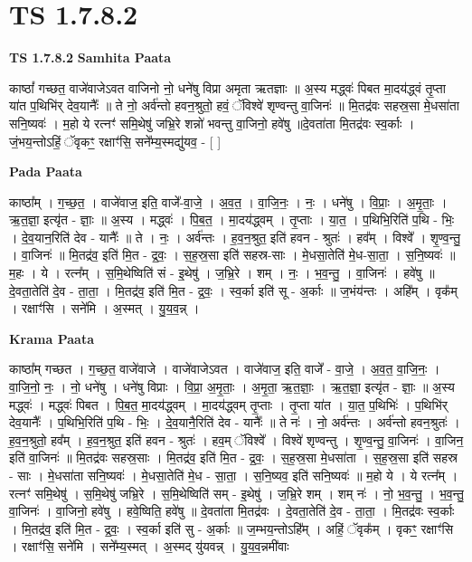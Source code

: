 \documentclass[17pt]{extarticle}
\begin{document}
\section{ TS 1.7.8.2 }

\textbf{TS 1.7.8.2 } \newline
\textbf{Samhita Paata} \newline

काष्ठां᳚ गच्छत॒ वाजे॑वाजेऽवत वाजिनो नो॒ धने॑षु विप्रा अमृता ऋतज्ञाः ॥ अ॒स्य मद्ध्वः॑ पिबत मा॒दय॑द्ध्वं तृ॒प्ता या॑त प॒थिभि॑र् देव॒यानैः᳚ ॥ ते नो॒ अर्व॑न्तो हवन॒श्रुतो॒ हवं॒ ॅविश्वे॑ शृण्वन्तु वा॒जिनः॑ ॥ मि॒तद्र॑वः सहस्र॒सा मे॒धसा॑ता सनि॒ष्यवः॑ । म॒हो ये रत्नꣳ॑ समि॒थेषु॑ जभ्रि॒रे शन्नो॑ भवन्तु वा॒जिनो॒ हवे॑षु ॥दे॒वता॑ता मि॒तद्र॑वः स्व॒र्काः । जं॒भय॒न्तोऽहिं॒ ॅवृकꣳ॒॒ रक्षाꣳ॑सि॒ सने᳚म्य॒स्मद्यु॑यव॒ - [ ] \newline

\textbf{Pada Paata} \newline

काष्ठा᳚म् । ग॒च्छ॒त॒ । वाजे॑वाज॒ इति॒ वाजे᳚-वा॒जे॒ । अ॒व॒त॒ । वा॒जि॒नः॒ । नः॒ । धने॑षु । वि॒प्राः॒ । अ॒मृ॒ताः॒ । ऋ॒त॒ज्ञा॒ इत्यृ॑त - ज्ञाः॒ ॥ अ॒स्य । मद्ध्वः॑ । पि॒ब॒त॒ । मा॒दय॑द्ध्वम् । तृ॒प्ताः । या॒त॒ । प॒थिभि॒रिति॑ प॒थि - भिः॒ । दे॒व॒यान॒रिति॑ देव - यानैः᳚ ॥ ते । नः॒ । अर्व॑न्तः । ह॒व॒न॒श्रुत॒ इति॑ हवन - श्रुतः॑ । हव᳚म् । विश्वे᳚ । शृ॒ण्व॒न्तु॒ । वा॒जिनः॑ ॥ मि॒तद्र॑व॒ इति॑ मि॒त - द्र॒वः॒ । स॒ह॒स्र॒सा इति॑ सहस्र-साः । मे॒धसा॒तेति॑ मे॒ध-सा॒ता॒ । स॒नि॒ष्यवः॑ ॥ म॒हः । ये । रत्न᳚म् । स॒मि॒थेष्विति॑ सं - इ॒थेषु॑ । ज॒भ्रि॒रे । शम् । नः॒ । भ॒व॒न्तु॒ । वा॒जिनः॑ । हवे॑षु ॥ दे॒वता॒तेति॑ दे॒व - ता॒ता॒ । मि॒तद्र॑व॒ इति॑ मि॒त - द्र॒वः॒ । स्व॒र्का इति॑ सू - अ॒र्काः ॥ ज॒भंय॑न्तः । अहि᳚म् । वृक᳚म् । रक्षाꣳ॑सि । सने॑मि । अ॒स्मत् । यु॒य॒व॒न्न् ।  \newline


\textbf{Krama Paata} \newline

काष्ठा᳚म् गच्छत । ग॒च्छ॒त॒ वाजे॑वाजे । वाजे॑वाजेऽवत । वाजे॑वाज॒ इति॒ वाजे᳚ - वा॒जे॒ । अ॒व॒त॒ वा॒जि॒नः॒ । वा॒जि॒नो॒ नः॒ । नो॒ धने॑षु । धने॑षु विप्राः । वि॒प्रा॒ अ॒मृ॒ताः॒ । अ॒मृ॒ता॒ ऋ॒त॒ज्ञाः॒ । ऋ॒त॒ज्ञा॒ इत्यृ॑त - ज्ञाः॒ ॥ अ॒स्य मद्ध्वः॑ । मद्ध्वः॑ पिबत । पि॒ब॒त॒ मा॒दय॑द्ध्वम् । मा॒दय॑द्ध्वम् तृ॒प्ताः । तृ॒प्ता या॑त । या॒त॒ प॒थिभिः॑ । प॒थिभि॑र् देव॒यानैः᳚ । प॒थिभि॒रिति॑ प॒थि - भिः॒ । दे॒व॒यानै॒रिति॑ देव - यानैः᳚ ॥ ते नः॑ । नो॒ अर्व॑न्तः । अर्व॑न्तो हवन॒श्रुतः॑ । ह॒व॒न॒श्रुतो॒ हव᳚म् । ह॒व॒न॒श्रुत॒ इति॑ हवन - श्रुतः॑ । हव॒म् ॅविश्वे᳚ । विश्वे॑ शृण्वन्तु । शृ॒ण्व॒न्तु॒ वा॒जिनः॑ । वा॒जिन॒ इति॑ वा॒जिनः॑ ॥ मि॒तद्र॑वः सहस्र॒साः । मि॒तद्र॑व॒ इति॑ मि॒त - द्र॒वः॒ । स॒ह॒स्र॒सा मे॒धसा॑ता । स॒ह॒स्र॒सा इति॑ सहस्र - साः । मे॒धसा॑ता सनि॒ष्यवः॑ । मे॒धसा॒तेति॑ मे॒ध - सा॒ता॒ । स॒नि॒ष्यव॒ इति॑ सनि॒ष्यवः॑ ॥ म॒हो ये । ये रत्न᳚म् । रत्नꣳ॑ समि॒थेषु॑ । स॒मि॒थेषु॑ जभ्रि॒रे । स॒मि॒थेष्विति॑ सम् - इ॒थेषु॑ । ज॒भ्रि॒रे शम् । शम् नः॑ । नो॒ भ॒व॒न्तु॒ । भ॒व॒न्तु॒ वा॒जिनः॑ । वा॒जिनो॒ हवे॑षु । हवे॒ष्विति॒ हवे॑षु ॥ दे॒वता॑ता मि॒तद्र॑वः । दे॒वता॒तेति॑ दे॒व - ता॒ता॒ । मि॒तद्र॑वः स्व॒र्काः । मि॒तद्र॑व॒ इति॑ मि॒त - द्र॒वः॒ । स्व॒र्का इति॑ सु - अ॒र्काः ॥ ज॒म्भय॒न्तोऽहि᳚म् । अहिं॒ ॅवृक᳚म् । वृकꣳ॒॒ रक्षाꣳ॑सि । रक्षाꣳ॑सि॒ सने॑मि । सने᳚म्य॒स्मत् । अ॒स्मद् यु॑यवन्न् । यु॒य॒व॒न्नमी॑वाः \newline
\end{document}
